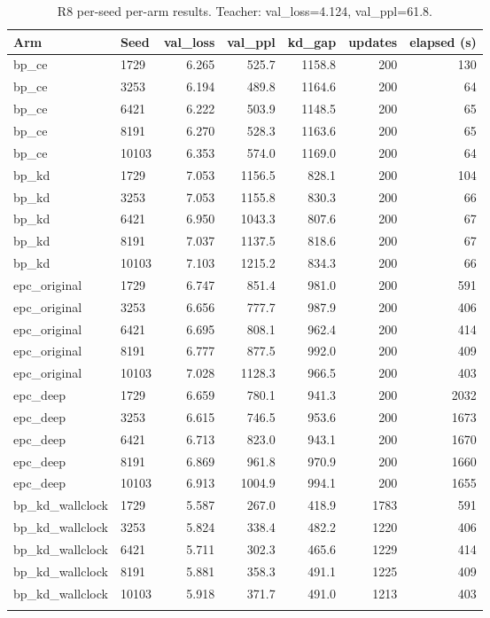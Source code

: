 \documentclass[11pt,a4paper]{article}
\begin{document}
\begin{longtable}{llrrrrr}
\toprule
\textbf{Arm} & \textbf{Seed} & \textbf{val\_loss} & \textbf{val\_ppl} & \textbf{kd\_gap} & \textbf{updates} & \textbf{elapsed (s)} \\
\midrule
\endhead
bp\_ce & 1729 & 6.265 & 525.7 & 1158.8 & 200 & 130 \\
bp\_ce & 3253 & 6.194 & 489.8 & 1164.6 & 200 & 64 \\
bp\_ce & 6421 & 6.222 & 503.9 & 1148.5 & 200 & 65 \\
bp\_ce & 8191 & 6.270 & 528.3 & 1163.6 & 200 & 65 \\
bp\_ce & 10103 & 6.353 & 574.0 & 1169.0 & 200 & 64 \\
\midrule
bp\_kd & 1729 & 7.053 & 1156.5 & 828.1 & 200 & 104 \\
bp\_kd & 3253 & 7.053 & 1155.8 & 830.3 & 200 & 66 \\
bp\_kd & 6421 & 6.950 & 1043.3 & 807.6 & 200 & 67 \\
bp\_kd & 8191 & 7.037 & 1137.5 & 818.6 & 200 & 67 \\
bp\_kd & 10103 & 7.103 & 1215.2 & 834.3 & 200 & 66 \\
\midrule
epc\_original & 1729 & 6.747 & 851.4 & 981.0 & 200 & 591 \\
epc\_original & 3253 & 6.656 & 777.7 & 987.9 & 200 & 406 \\
epc\_original & 6421 & 6.695 & 808.1 & 962.4 & 200 & 414 \\
epc\_original & 8191 & 6.777 & 877.5 & 992.0 & 200 & 409 \\
epc\_original & 10103 & 7.028 & 1128.3 & 966.5 & 200 & 403 \\
\midrule
epc\_deep & 1729 & 6.659 & 780.1 & 941.3 & 200 & 2032 \\
epc\_deep & 3253 & 6.615 & 746.5 & 953.6 & 200 & 1673 \\
epc\_deep & 6421 & 6.713 & 823.0 & 943.1 & 200 & 1670 \\
epc\_deep & 8191 & 6.869 & 961.8 & 970.9 & 200 & 1660 \\
epc\_deep & 10103 & 6.913 & 1004.9 & 994.1 & 200 & 1655 \\
\midrule
bp\_kd\_wallclock & 1729 & 5.587 & 267.0 & 418.9 & 1783 & 591 \\
bp\_kd\_wallclock & 3253 & 5.824 & 338.4 & 482.2 & 1220 & 406 \\
bp\_kd\_wallclock & 6421 & 5.711 & 302.3 & 465.6 & 1229 & 414 \\
bp\_kd\_wallclock & 8191 & 5.881 & 358.3 & 491.1 & 1225 & 409 \\
bp\_kd\_wallclock & 10103 & 5.918 & 371.7 & 491.0 & 1213 & 403 \\
\bottomrule
\caption{R8 per-seed per-arm results. Teacher: val\_loss=4.124, val\_ppl=61.8.}
\label{tab:r8-per-seed}
\end{longtable}
\end{document}
